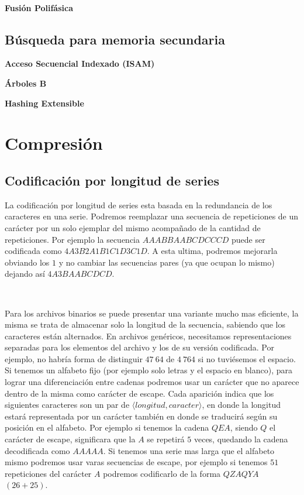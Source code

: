 ~

\textbf{Fusi\'on Polif\'asica}

\subsection{B\'usqueda para memoria secundaria}

\textbf{Acceso Secuencial Indexado (ISAM)}

\textbf{\'Arboles B}

\textbf{Hashing Extensible}

\newpage
\section{Compresi\'on}
\subsection{Codificaci\'on por longitud de series}

La codificaci\'on por longitud de series esta basada en la redundancia de los caracteres en una serie. Podremos reemplazar una secuencia de repeticiones de un car\'acter por un solo ejemplar del mismo acompa\~nado de la cantidad de repeticiones. Por ejemplo la secuencia $AAABBAABCDCCCD$ puede ser codificada como $4A3B2A1B1C1D3C1D$. A esta ultima, podremos mejorarla obviando los $1$ y no cambiar las secuencias pares (ya que ocupan lo mismo) dejando as\'i $4A3BAABCDCD$.

~

Para los archivos binarios se puede presentar una variante mucho mas eficiente, la misma se trata de almacenar solo la longitud de la secuencia, sabiendo que los caracteres est\'an alternados. En archivos gen\'ericos, necesitamos representaciones separadas para los elementos del archivo y los de su versi\'on codificada. Por ejemplo, no habr\'ia forma de distinguir $47\ 64$ de $4\ 764$ si no tuvi\'esemos el espacio. Si tenemos un alfabeto fijo (por ejemplo solo letras y el espacio en blanco), para lograr una diferenciaci\'on entre cadenas podremos usar un car\'acter que no aparece dentro de la misma como car\'acter de escape. Cada aparici\'on indica que los siguientes caracteres son un par de $\langle longitud, caracter \rangle$, en donde la longitud estar\'a representada por un car\'acter tambi\'en en donde se traducir\'a seg\'un su posici\'on en el alfabeto. Por ejemplo si tenemos la cadena $QEA$, siendo $Q$ el car\'acter de escape, significara que la $A$ se repetir\'a $5$ veces, quedando la cadena
decodificada como $AAAAA$. Si tenemos una serie mas larga que el alfabeto mismo podremos usar varas secuencias de escape, por ejemplo si tenemos $51$ repeticiones del car\'acter $A$ podremos codificarlo de la forma $QZAQYA$ $(26+25)$.

